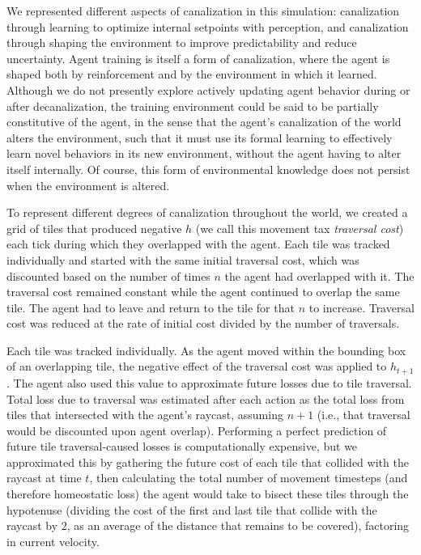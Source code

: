 We represented different aspects of canalization in this simulation: canalization through learning to optimize internal setpoints with perception, and canalization through shaping the environment to improve predictability and reduce uncertainty. Agent training is itself a form of canalization, where the agent is shaped both by reinforcement and by the environment in which it learned. Although we do not presently explore actively updating agent behavior during or after decanalization, the training environment could be said to be partially constitutive of the agent, in the sense that the agent's canalization of the world alters the environment, such that it must use its formal learning to effectively learn novel behaviors in its new environment, without the agent having to alter itself internally. Of course, this form of environmental knowledge does not persist when the environment is altered.

To represent different degrees of canalization throughout the world, we created a grid of tiles that produced negative \(h\) (we call this movement tax \emph{traversal cost}) each tick during which they overlapped with the agent. Each tile was tracked individually and started with the same initial traversal cost, which was discounted based on the number of times \(n\) the agent had overlapped with it. The traversal cost remained constant while the agent continued to overlap the same tile. The agent had to leave and return to the tile for that \(n\) to increase. Traversal cost was reduced at the rate of initial cost divided by the number of traversals.

Each tile was tracked individually. As the agent moved within the bounding box of an overlapping tile, the negative effect of the traversal cost was applied to \(h_{t+1}\). The agent also used this value to approximate future losses due to tile traversal. Total loss due to traversal was estimated after each action as the total loss from tiles that intersected with the agent's raycast, assuming \(n+1\) (i.e., that traversal would be discounted upon agent overlap). Performing a perfect prediction of future tile traversal-caused losses is computationally expensive, but we approximated this by gathering the future cost of each tile that collided with the raycast at time \(t\), then calculating the total number of movement timesteps (and therefore homeostatic loss) the agent would take to bisect these tiles through the hypotenuse (dividing the cost of the first and last tile that collide with the raycast by \(2\), as an average of the distance that remains to be covered), factoring in current velocity.

